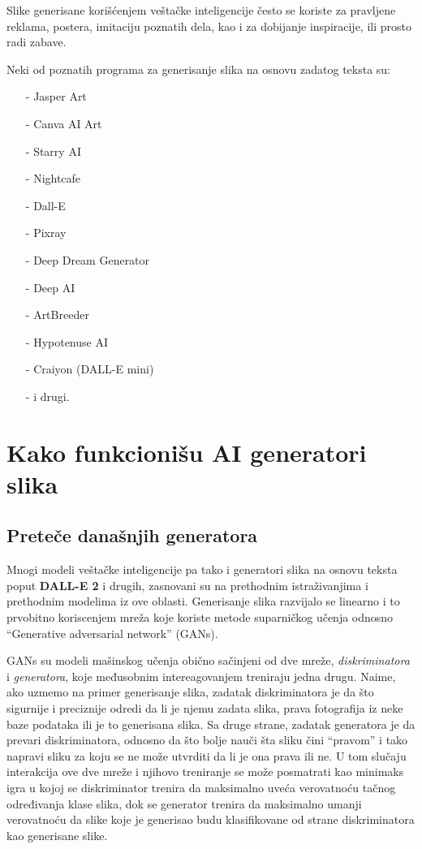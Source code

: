\documentclass[12pt, letterpaper]{article}
\begin{document}
Slike generisane korišćenjem veštačke inteligencije često se koriste za pravljene reklama, postera, imitaciju poznatih dela, kao i za dobijanje inspiracije, ili prosto radi zabave.  

  

Neki od poznatih programa za generisanje slika na osnovu zadatog teksta su: 

\begin{itemize} 

\item[-] Jasper Art 
\item[-] Canva AI Art 
\item[-] Starry AI 
\item[-] Nightcafe 
\item[-] Dall-E 
\item[-] Pixray 
\item[-] Deep Dream Generator 
\item[-] Deep AI 
\item[-] ArtBreeder 
\item[-] Hypotenuse AI 
\item[-] Craiyon (DALL-E mini) 
\item[-] i drugi. 

\end{itemize} 

\cite{kljucTri} 

\pagebreak
\section{Kako funkcionišu AI generatori slika}
\subsection*{Preteče današnjih generatora}
Mnogi modeli veštačke inteligencije pa tako i generatori slika na osnovu teksta poput \textbf{DALL-E 2} i drugih, zasnovani su na prethodnim istraživanjima i prethodnim modelima iz ove oblasti.
Generisanje slika razvijalo se linearno i to prvobitno koriscenjem mreža koje koriste metode suparničkog učenja odnosno “Generative adversarial network” (GANs).

GANs su modeli mašinskog učenja obično sačinjeni od dve mreže, \textit{diskriminatora} i \textit{generatora}, koje međusobnim intereagovanjem treniraju jedna drugu. Naime, ako uzmemo na primer generisanje slika, zadatak diskriminatora je da što sigurnije i preciznije odredi da li je njemu zadata slika, prava fotografija iz neke baze podataka ili je to generisana slika. Sa druge strane, zadatak generatora je da prevari diskriminatora, odnosno da što bolje nauči šta sliku čini “pravom” i tako napravi sliku za koju se ne može utvrditi da li je ona prava ili ne. U tom slučaju interakcija ove dve mreže i njihovo treniranje se može posmatrati kao minimaks igra u kojoj se diskriminator trenira da maksimalno uveća verovatnoću tačnog određivanja klase slika, dok se generator trenira da maksimalno umanji verovatnoću da slike koje je generisao budu klasifikovane od strane diskriminatora kao generisane slike.\cite{gan1, gan2, ganvideo}
\end{document}
